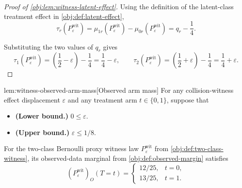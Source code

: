 \documentclass[11pt]{article}
\begin{document}
\begin{proof}[Proof of \cref{obj:lem:witness-latent-effect}]
Using the definition of the latent-class treatment effect in \cref{obj:def:latent-effect},
\[
\tau_r(P_{\varepsilon}^{\mathrm{wit}})
=
\mu_{1r}(P_{\varepsilon}^{\mathrm{wit}})
-
\mu_{0r}(P_{\varepsilon}^{\mathrm{wit}})
=
q_r-\frac14.
\] %

Substituting the two values of \(q_r\) gives
\[
\tau_1(P_{\varepsilon}^{\mathrm{wit}})
=
\left(\frac12-\varepsilon\right)-\frac14
=
\frac14-\varepsilon,
\qquad
\tau_2(P_{\varepsilon}^{\mathrm{wit}})
=
\left(\frac12+\varepsilon\right)-\frac14
=
\frac14+\varepsilon.
\] %
\end{proof}

\begin{lemmav}{lem:witness-observed-arm-mass}[Observed arm mass]
For any collision-witness effect displacement \(\varepsilon\) and any treatment arm \(t\in\{0,1\}\), suppose that
\begin{itemize}
\item \textbf{(Lower bound.)} \(0\le \varepsilon\).
\item \textbf{(Upper bound.)} \(\varepsilon\le 1/8\).
\end{itemize}
For the two-class Bernoulli proxy witness law \(P_{\varepsilon}^{\mathrm{wit}}\) from \cref{obj:def:two-class-witness}, its observed-data marginal from \cref{obj:def:observed-margin} satisfies
\[
(P_{\varepsilon}^{\mathrm{wit}})_O(T=t)
=
\begin{cases}
12/25, & t=0,\\
13/25, & t=1.
\end{cases}
\]
\end{lemmav}
\end{document}
